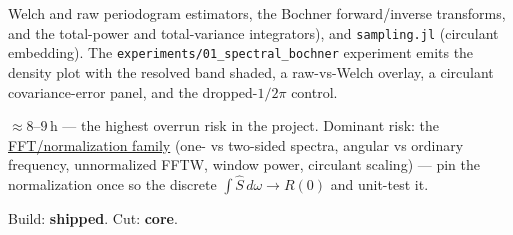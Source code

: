 \documentclass[11pt]{article}
\newenvironment{brief}{%
  \begin{description}[style=sameline,leftmargin=2.3cm,font=\bfseries\color{hubblue}]
}{%
  \end{description}
}
\begin{document}
\begin{brief}
Welch and raw periodogram estimators, the Bochner forward/inverse transforms, and the total-power and
total-variance integrators), and \texttt{sampling.jl} (circulant embedding). The
\texttt{experiments/01\_spectral\_bochner} experiment emits the density plot with the resolved band
shaded, a raw-vs-Welch overlay, a circulant covariance-error panel, and the dropped-$1/2\pi$ control.
\item[Effort \& risk] $\approx 8$--$9$\,h --- the highest overrun risk in the project. Dominant risk:
the \hyperref[sec:risk]{FFT/normalization family} (one- vs two-sided spectra, angular vs ordinary
frequency, unnormalized FFTW, window power, circulant scaling) --- pin the normalization once so the
discrete $\int\widehat S\,d\omega\to R(0)$ and unit-test it.
\item[Status] Build: \textbf{shipped}. Cut: \textbf{core}.
\end{brief}

\end{document}
